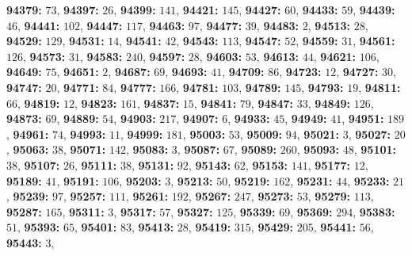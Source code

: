 \textsf{\bfseries 94379:} $73$, \textsf{\bfseries 94397:} $26$, \textsf{\bfseries 94399:} $141$, \textsf{\bfseries 94421:} $145$, \textsf{\bfseries 94427:} $60$, \textsf{\bfseries 94433:} $59$, \textsf{\bfseries 94439:} $46$, \textsf{\bfseries 94441:} $102$, \textsf{\bfseries 94447:} $117$, \textsf{\bfseries 94463:} $97$, \textsf{\bfseries 94477:} $39$, \textsf{\bfseries 94483:} $2$, \textsf{\bfseries 94513:} $28$, \textsf{\bfseries 94529:} $129$, \textsf{\bfseries 94531:} $14$, \textsf{\bfseries 94541:} $42$, \textsf{\bfseries 94543:} $113$, \textsf{\bfseries 94547:} $52$, \textsf{\bfseries 94559:} $31$, \textsf{\bfseries 94561:} $126$, \textsf{\bfseries 94573:} $31$, \textsf{\bfseries 94583:} $240$, \textsf{\bfseries 94597:} $28$, \textsf{\bfseries 94603:} $53$, \textsf{\bfseries 94613:} $44$, \textsf{\bfseries 94621:} $106$, \textsf{\bfseries 94649:} $75$, \textsf{\bfseries 94651:} $2$, \textsf{\bfseries 94687:} $69$, \textsf{\bfseries 94693:} $41$, \textsf{\bfseries 94709:} $86$, \textsf{\bfseries 94723:} $12$, \textsf{\bfseries 94727:} $30$, \textsf{\bfseries 94747:} $20$, \textsf{\bfseries 94771:} $84$, \textsf{\bfseries 94777:} $166$, \textsf{\bfseries 94781:} $103$, \textsf{\bfseries 94789:} $145$, \textsf{\bfseries 94793:} $19$, \textsf{\bfseries 94811:} $66$, \textsf{\bfseries 94819:} $12$, \textsf{\bfseries 94823:} $161$, \textsf{\bfseries 94837:} $15$, \textsf{\bfseries 94841:} $79$, \textsf{\bfseries 94847:} $33$, \textsf{\bfseries 94849:} $126$, \textsf{\bfseries 94873:} $69$, \textsf{\bfseries 94889:} $54$, \textsf{\bfseries 94903:} $217$, \textsf{\bfseries 94907:} $6$, \textsf{\bfseries 94933:} $45$, \textsf{\bfseries 94949:} $41$, \textsf{\bfseries 94951:} $189$, \textsf{\bfseries 94961:} $74$, \textsf{\bfseries 94993:} $11$, \textsf{\bfseries 94999:} $181$, \textsf{\bfseries 95003:} $53$, \textsf{\bfseries 95009:} $94$, \textsf{\bfseries 95021:} $3$, \textsf{\bfseries 95027:} $20$, \textsf{\bfseries 95063:} $38$, \textsf{\bfseries 95071:} $142$, \textsf{\bfseries 95083:} $3$, \textsf{\bfseries 95087:} $67$, \textsf{\bfseries 95089:} $260$, \textsf{\bfseries 95093:} $48$, \textsf{\bfseries 95101:} $38$, \textsf{\bfseries 95107:} $26$, \textsf{\bfseries 95111:} $38$, \textsf{\bfseries 95131:} $92$, \textsf{\bfseries 95143:} $62$, \textsf{\bfseries 95153:} $141$, \textsf{\bfseries 95177:} $12$, \textsf{\bfseries 95189:} $41$, \textsf{\bfseries 95191:} $106$, \textsf{\bfseries 95203:} $3$, \textsf{\bfseries 95213:} $50$, \textsf{\bfseries 95219:} $162$, \textsf{\bfseries 95231:} $44$, \textsf{\bfseries 95233:} $21$, \textsf{\bfseries 95239:} $97$, \textsf{\bfseries 95257:} $111$, \textsf{\bfseries 95261:} $192$, \textsf{\bfseries 95267:} $247$, \textsf{\bfseries 95273:} $53$, \textsf{\bfseries 95279:} $113$, \textsf{\bfseries 95287:} $165$, \textsf{\bfseries 95311:} $3$, \textsf{\bfseries 95317:} $57$, \textsf{\bfseries 95327:} $125$, \textsf{\bfseries 95339:} $69$, \textsf{\bfseries 95369:} $294$, \textsf{\bfseries 95383:} $51$, \textsf{\bfseries 95393:} $65$, \textsf{\bfseries 95401:} $83$, \textsf{\bfseries 95413:} $28$, \textsf{\bfseries 95419:} $315$, \textsf{\bfseries 95429:} $205$, \textsf{\bfseries 95441:} $56$, \textsf{\bfseries 95443:} $3$, 
